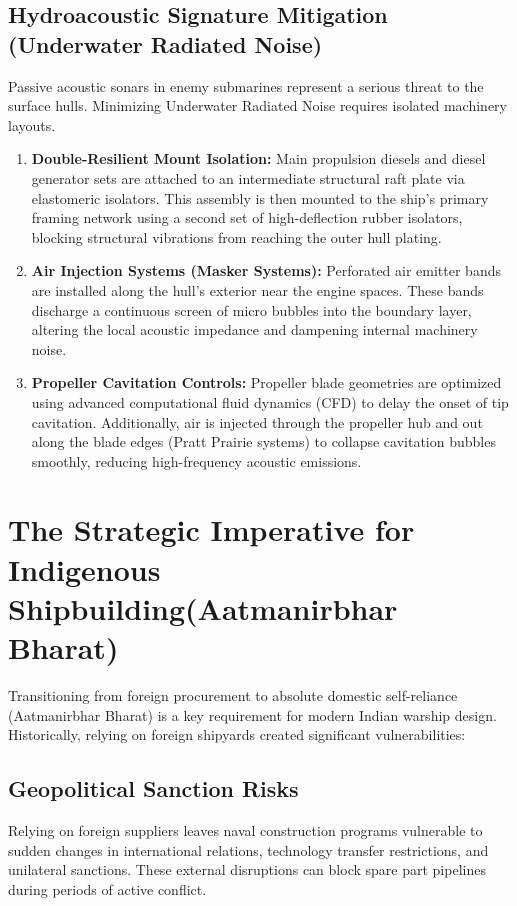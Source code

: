 \documentclass[12pt,a4paper,twoside]{report}
\begin{document}
\subsection{Hydroacoustic Signature Mitigation (Underwater Radiated Noise)}
Passive acoustic sonars in enemy submarines represent a serious threat to the surface hulls. Minimizing Underwater Radiated Noise requires isolated machinery layouts.
\begin{enumerate}[\alph*)]
    \item \textbf{Double-Resilient Mount Isolation: }
    Main propulsion diesels and diesel generator sets are attached to an intermediate structural raft plate via elastomeric isolators. This assembly is then mounted to the ship's primary framing network using a second set of high-deflection rubber isolators, blocking structural vibrations from reaching the outer hull plating.
    \item \textbf{Air Injection Systems (Masker Systems): }
    Perforated air emitter bands are installed along the hull's exterior near the engine spaces. These bands discharge a continuous screen of micro bubbles into the boundary layer, altering the local acoustic impedance and dampening internal machinery noise.
    \item \textbf{Propeller Cavitation Controls: }
    Propeller blade geometries are optimized using advanced computational fluid dynamics (CFD) to delay the onset of tip cavitation. Additionally, air is injected through the propeller hub and out along the blade edges (Pratt Prairie systems) to collapse cavitation bubbles smoothly, reducing high-frequency acoustic emissions.
\end{enumerate}
\section{The Strategic Imperative for Indigenous Shipbuilding(Aatmanirbhar Bharat)}Transitioning from foreign procurement to absolute domestic self-reliance 
(Aatmanirbhar Bharat) is a key requirement for modern Indian warship design. 
Historically, relying on foreign shipyards created significant vulnerabilities: 

\subsection{Geopolitical Sanction Risks }
Relying on foreign suppliers leaves naval construction programs 
vulnerable to sudden changes in international relations, technology 
transfer restrictions, and unilateral sanctions. These external  
disruptions can block spare part pipelines during periods of active 
conflict.
\end{document}
